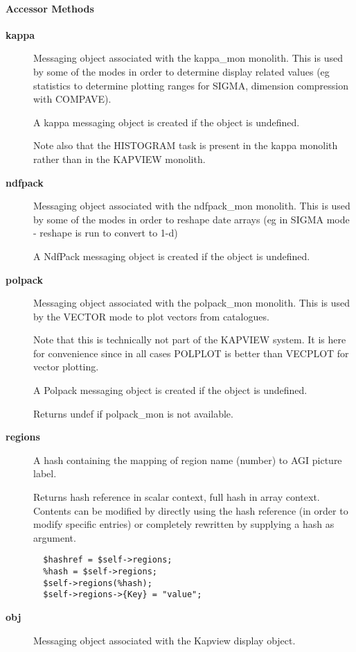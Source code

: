 \paragraph*{Accessor Methods\label{ORAC::Display::KAPVIEW_Accessor_Methods}}\begin{description}
\item[\textbf{kappa}] \mbox{}

Messaging object associated with the kappa\_mon monolith.
This is used by some of the modes in order to determine
display related values (eg statistics to determine plotting
ranges for SIGMA, dimension compression with COMPAVE).



A kappa messaging object is created if the object is undefined.



Note also that the HISTOGRAM task is present in the kappa monolith
rather than in the KAPVIEW monolith.

\item[\textbf{ndfpack}] \mbox{}

Messaging object associated with the ndfpack\_mon monolith.
This is used by some of the modes in order to reshape
date arrays (eg in SIGMA mode - reshape is run to convert
to 1-d)



A NdfPack messaging object is created if the object is undefined.

\item[\textbf{polpack}] \mbox{}

Messaging object associated with the polpack\_mon monolith.
This is used by the VECTOR mode to plot vectors from catalogues.



Note that this is technically not part of the KAPVIEW system.
It is here for convenience since in all cases POLPLOT is better
than VECPLOT for vector plotting.



A Polpack messaging object is created if the object is undefined.



Returns undef if polpack\_mon is not available.

\item[\textbf{regions}] \mbox{}

A hash containing the mapping of region name (number) to
AGI picture label.



Returns hash reference in scalar context, full hash in array context.
Contents can be modified by directly using the hash reference
(in order to modify specific entries) or completely rewritten by
supplying a hash as argument.

\begin{verbatim}
  $hashref = $self->regions;
  %hash = $self->regions;
  $self->regions(%hash);
  $self->regions->{Key} = "value";
\end{verbatim}
\item[\textbf{obj}] \mbox{}

Messaging object associated with the Kapview display object.

\end{description}
